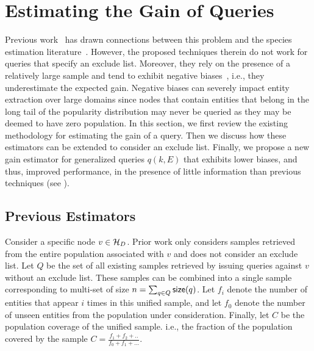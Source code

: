 
\section{Estimating the Gain of Queries}
\label{sec:gainestimators}
Previous work~\cite{trushkowsky:2013} has drawn connections between this problem and the species estimation literature~\cite{chao:1992}. However, the proposed techniques therein do not work for queries that specify an exclude list. Moreover, they rely on the presence of a relatively large sample and tend to exhibit negative biases~\cite{hwang:2010, shen:2003}, i.e., they underestimate the expected gain. Negative biases can severely impact entity extraction over large domains since nodes that contain entities that belong in the long tail of the popularity distribution may never be queried as they may be deemed to have zero population. In this section, we first review the existing methodology for estimating the gain of a query. Then we discuss how these estimators can be extended to consider an exclude list. Finally, we propose a new gain estimator for generalized queries $q(k,E)$ that exhibits lower biases, and thus, improved performance, in the presence of little information than previous techniques (see ).

\subsection{Previous Estimators}
\label{sec:prevest}
Consider a specific node $v \in \mathcal{H}_D$. Prior work only considers samples retrieved from the entire population associated with $v$ and does not consider an exclude list. Let $Q$ be the set of all existing samples retrieved by issuing queries against $v$ without an exclude list. These samples can be combined into a single sample corresponding to multi-set of size $n = \sum_{q \in Q} {\sf size}(q)$. Let $f_i$ denote the number of entities that appear $i$ times in this unified sample, and let $f_0$ denote the number of unseen entities from the population under consideration. Finally, let $C$ be the population coverage of the unified sample. i.e., the fraction of the population covered by the sample  $C = \frac{f_1 + f_2 + ..}{f_0 + f_1 + ...}$.

